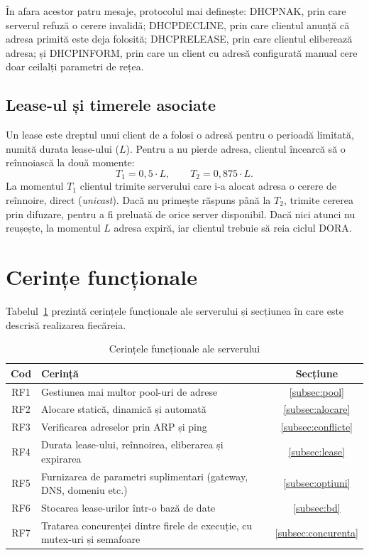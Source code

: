 \documentclass[conference]{IEEEtran}
\begin{document}
În afara acestor patru mesaje, protocolul mai definește: DHCPNAK, prin care serverul refuză o cerere invalidă; DHCPDECLINE, prin care clientul anunță că adresa primită este deja folosită; DHCPRELEASE, prin care clientul eliberează adresa; și DHCPINFORM, prin care un client cu adresă configurată manual cere doar ceilalți parametri de rețea.

\subsection{Lease-ul și timerele asociate}
Un lease este dreptul unui client de a folosi o adresă pentru o perioadă limitată, numită durata lease-ului ($L$). Pentru a nu pierde adresa, clientul încearcă să o reînnoiască la două momente:
\begin{equation}
T_1 = 0{,}5 \cdot L, \qquad T_2 = 0{,}875 \cdot L .\label{eq:timere}
\end{equation}
La momentul $T_1$ clientul trimite serverului care i-a alocat adresa o cerere de reînnoire, direct (\textit{unicast}). Dacă nu primește răspuns până la $T_2$, trimite cererea prin difuzare, pentru a fi preluată de orice server disponibil. Dacă nici atunci nu reușește, la momentul $L$ adresa expiră, iar clientul trebuie să reia ciclul DORA.

\section{Cerințe funcționale}\label{sec:cerinte}
Tabelul~\ref{tab:cerinte} prezintă cerințele funcționale ale serverului și secțiunea în care este descrisă realizarea fiecăreia.

\begin{table}[htbp]
\caption{Cerințele funcționale ale serverului}
\begin{center}
\begin{tabular}{|c|p{5.3cm}|c|}
\hline
\textbf{Cod} & \textbf{Cerință} & \textbf{Secțiune} \\
\hline
RF1 & Gestiunea mai multor pool-uri de adrese & \ref{subsec:pool} \\
\hline
RF2 & Alocare statică, dinamică și automată & \ref{subsec:alocare} \\
\hline
RF3 & Verificarea adreselor prin ARP și ping & \ref{subsec:conflicte} \\
\hline
RF4 & Durata lease-ului, reînnoirea, eliberarea și expirarea & \ref{subsec:lease} \\
\hline
RF5 & Furnizarea de parametri suplimentari (gateway, DNS, domeniu etc.) & \ref{subsec:optiuni} \\
\hline
RF6 & Stocarea lease-urilor într-o bază de date & \ref{subsec:bd} \\
\hline
RF7 & Tratarea concurenței dintre firele de execuție, cu mutex-uri și semafoare & \ref{subsec:concurenta} \\
\hline
\end{tabular}
\label{tab:cerinte}
\end{center}
\end{table}
\end{document}
